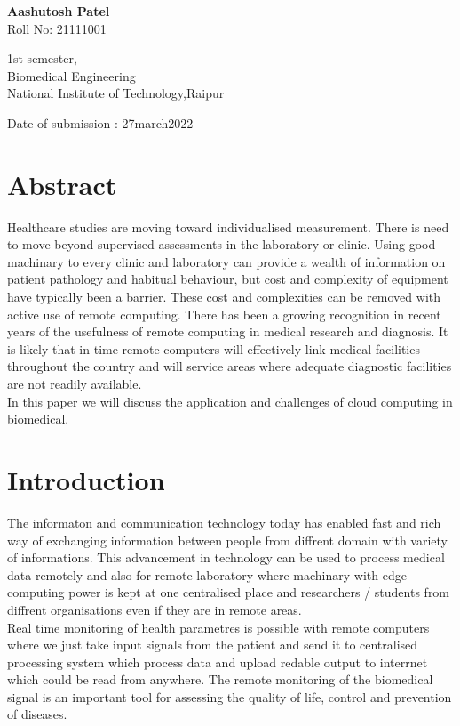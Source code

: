\documentclass[12pt]{article}
\begin{document}
	\vspace{5cm}
	
	\textbf{Aashutosh Patel}
	\\{Roll No:} 21111001
	
	
	1st semester,
	\\ Biomedical Engineering
	\\National Institute of Technology,Raipur
	\\
	\raggedright
	
	\vspace{3.5cm}
	Date of submission : 27march2022
	
	\tableofcontents
	\clearpage
	\section{Abstract}
	Healthcare studies are moving toward individualised measurement. There is need to 
	move beyond supervised assessments in the laboratory or clinic. Using good machinary to every clinic and laboratory  can provide a wealth of information on patient pathology and habitual behaviour, but cost and complexity of equipment have typically been a barrier. These cost and complexities can be removed with active use of remote computing. There has been a growing recognition in recent years of the usefulness of remote computing in medical research and diagnosis. It is likely that in time remote computers will effectively link medical facilities throughout the country and will service areas where adequate diagnostic facilities are not readily available.
	\\In this paper we will discuss the application and challenges of cloud computing in biomedical.
	\\
	\clearpage
	\section{Introduction}
	The informaton and communication technology today has enabled fast and rich way of exchanging information between people from diffrent domain with variety of informations. This advancement in technology can be used to process medical data remotely and also for remote laboratory where machinary with edge computing power is kept at one centralised place and researchers / students from diffrent organisations even if they are in remote areas.
	\\
	Real time monitoring of health parametres is possible with remote computers where we just take input signals from the patient and send it to centralised processing system which process data and upload redable output to interrnet which could be read from anywhere. The remote monitoring of the biomedical signal is an important tool for assessing the quality of life, control and prevention of diseases.
	\\
	\clearpage
\end{document}
